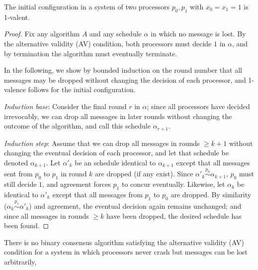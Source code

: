 \begin{lemma} \label{lemma:initial_univalent}
The initial configuration in a system of two processors $p_0, p_1$ with $x_0 = x_1 = 1$
is 1-valent.
\end{lemma}

\begin{proof}
Fix any algorithm $A$ and any schedule $\alpha$ in which no message is lost.
By the alternative validity (AV) condition, both processors must decide $1$
in $\alpha$, and by termination the algorithm must eventually terminate.

In the following, we show by bounded induction on the round number that all 
messages may be dropped without changing the decision of each
processor, and 1-valence follows for the initial configuration.

\emph{Induction base}: Consider the final round $r$ in $\alpha$; since all processors have
decided irrevocably, we can drop all messages in later rounds without changing the
outcome of the algorithm, and call this schedule $\alpha_{r+1}$.

\emph{Induction step}: Assume that we can drop all messages in rounds $\geq k + 1$ without
changing the eventual decision of each processor, and let that schedule be denoted $\alpha_{k+1}$.
Let $\alpha'_k$ be an
schedule identical to $\alpha_{k+1}$ except that all messages sent from $p_0$ to $p_1$ in round $k$
are dropped (if any exist). Since
$\alpha'_k \stackrel{p_0}{\sim} \alpha_{k+1}$, $p_0$ must still decide $1$, and agreement
forces $p_1$ to concur eventually.
Likewise, let $\alpha_k$ be identical to $\alpha'_k$ except that all messages from $p_1$ to $p_0$
are dropped. By similarity ($\alpha_k \stackrel{p_1}{\sim} \alpha'_k$) and agreement, the eventual
decision again remains unchanged; and since all messages in rounds $\geq k$ have been dropped, the
desired schedule has been found.
\end{proof}


\begin{theorem} \label{thm:no_av_consensus}
There is no binary consensus algorithm satisfying the alternative validity (AV)
condition for a system in which processors never crash but messages can be
lost arbitrarily,
\end{theorem}

